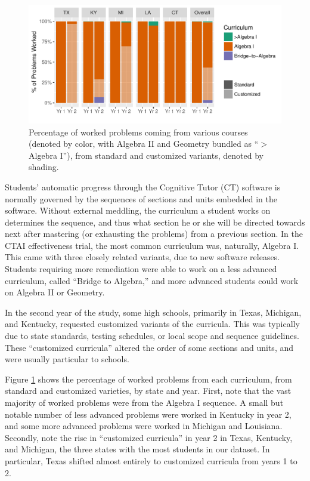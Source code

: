 \documentclass[notitlepage,12pt]{jedm}\usepackage[]{graphicx}\usepackage[]{color}
\makeatletter
\def\maxwidth{ %
  \ifdim\Gin@nat@width>\linewidth
    \linewidth
  \else
    \Gin@nat@width
  \fi
}
\makeatother
\begin{document}
\begin{figure}
  \centering

\includegraphics[width=\maxwidth]{figure/curricula-1} 

\caption{Percentage of worked problems coming from various courses
  (denoted by color, with Algebra II and Geometry bundled as ``$>$Algebra I''), from
  standard and customized variants, denoted by shading.}
\label{fig:curricula}
\end{figure}

Students' automatic progress through the Cognitive Tutor (CT) software
is normally governed by
the sequences of sections and units embedded in the software.
Without external meddling, the curriculum a student works on
determines the sequence, and thus what section he or she will be directed towards next after
mastering (or exhausting the problems) from a previous section.
In the CTAI effectiveness trial, the most common curriculum was,
naturally, Algebra I.
This came with three closely related variants, due to new software releases.
Students requiring more remediation were able to work on a less
advanced curriculum, called ``Bridge to Algebra,'' and more advanced
students could work on Algebra II or Geometry.

In the second year of the study, some high schools, primarily in
Texas, Michigan, and Kentucky, requested customized variants of the
curricula.
This was typically due to state standards, testing schedules, or local
scope and sequence guidelines.
These ``customized curricula'' altered the order of some sections and
units, and were usually particular to schools.

Figure \ref{fig:curricula} shows the percentage of worked problems
from each curriculum, from standard and customized varieties, by state
and year.
First, note that the vast majority of worked problems were from the
Algebra I sequence.
A small but notable number of less advanced problems were worked in
Kentucky in year 2, and some more advanced problems were worked in
Michigan and Louisiana.
Secondly, note the rise in ``customized curricula'' in year 2 in
Texas, Kentucky, and Michigan, the three states with the most students
in our dataset.
In particular, Texas shifted almost entirely to customized curricula
from years 1 to 2.
\end{document}
